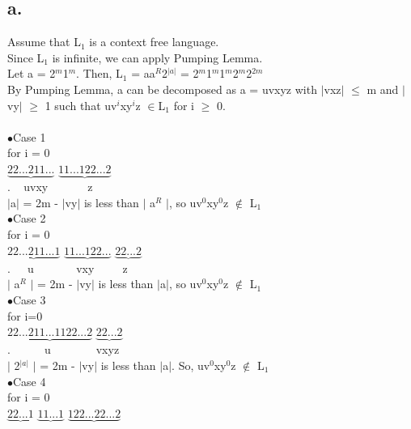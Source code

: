 \documentclass[12pt]{article}
\begin{document}
\subsection*{a.}
Assume that L$_1$ is a context free language. \\
Since L$_1$ is infinite, we can apply Pumping Lemma. \\
Let a = 2$^m$1$^m$. Then, L$_1$ = aa$^R$2$^{|a|}$ = 2$^m$1$^m$1$^m$2$^m$2$^{2m}$ \\
By Pumping Lemma, a can be decomposed as a = uvxyz with $\vert$vxz$\vert$ $\leq$ m and $\vert$vy$\vert$ $\geq$ 1 such that uv$^i$xy$^i$z $\in$L$_1$ for i $\geq$ 0. \\
\\
$\bullet$Case 1 \\
for i = 0 \\
$\underbrace{22...211...}$ $\underbrace{11...122...2}$ \\
.$\hspace{14pt}$uvxy$ \hspace{42pt}$z \\
$\vert$a$\vert$ = 2m - $\vert$vy$\vert$ is less than $\vert$ a$^R$ $\vert$, so uv$^0$xy$^0$z $\notin$ L$_1$ \\
$\bullet$Case 2 \\
for i = 0 \\
$\underbrace{22...211...1}$ $\underbrace{11...122...}$ $\underbrace{22...2}$ \\
.$\hspace{18pt}$u$\hspace{45pt}$vxy$\hspace{30pt}$z \\
$\vert$ a$^R$ $\vert$ = 2m - $\vert$vy$\vert$ is less than $\vert$a$\vert$, so uv$^0$xy$^0$z $\notin$ L$_1$ \\
$\bullet$Case 3 \\
for i=0 \\
$\underbrace{22...211...1122...2}$ $\underbrace{22...2}$ \\
.$\hspace{36pt}$u$ \hspace{48pt}$vxyz \\
$\vert$ 2$^{|a|}$ $\vert$ = 2m - $\vert$vy$\vert$ is less than $\vert$a$\vert$. So, uv$^0$xy$^0$z $\notin$ L$_1$ \\
$\bullet$Case 4 \\
for i = 0 \\
$\underbrace{22...1}$ $\underbrace{11...1}$ $\underbrace{122...22...2}$\\
\end{document}
